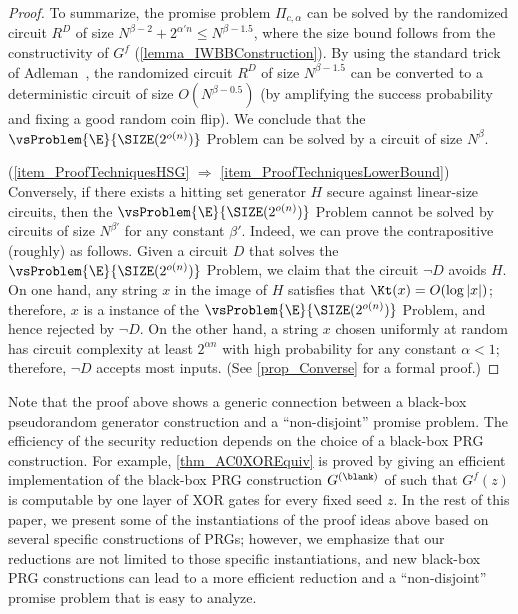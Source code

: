 \documentclass{toc}
\begin{document}
\begin{proof}
  To summarize,
  the promise problem $\Pi_{c, \alpha}$
  can be solved by the randomized circuit $R^D$
  of size $N^{\beta - 2} + 2^{\alpha' n} \le N^{\beta - 1.5}$, where the size bound follows from
  the constructivity of $G^f$ (\cref{lemma_IWBBConstruction}).
  By using the standard trick of Adleman~\cite{Adleman78_focs_conf},
  the randomized circuit $R^D$ of size $N^{\beta - 1.5}$ can be converted to a
  deterministic circuit of size $O(N^{\beta-0.5})$
  (by amplifying the success probability and fixing a good random coin flip).
  We conclude that
  the $\vsProblem{\E}{\SIZE(2^{o(n)})}$ Problem can be solved by a circuit of size $N^{\beta}$.

  (\cref{item_ProofTechniquesHSG} $\Rightarrow$ \ref{item_ProofTechniquesLowerBound})
  Conversely,
  if there exists a hitting set generator $H$ secure against linear-size circuits,
  then the $\vsProblem{\E}{\SIZE(2^{o(n)})}$ Problem cannot be solved by circuits of size $N^{\beta'}$
  for any constant $\beta'$.
  Indeed, we can prove the contrapositive (roughly) as follows.
  Given a circuit $D$ that solves the $\vsProblem{\E}{\SIZE(2^{o(n)})}$ Problem,
  we claim that the circuit $\neg D$ avoids $H$.
  On one hand,
  any string $x$ in the image of $H$ satisfies that $\Kt(x) = O(\log |x|)$;
  therefore, $x$ is a \Yes instance of
  the $\vsProblem{\E}{\SIZE(2^{o(n)})}$ Problem,
  and hence rejected by $\neg D$.
  On the other hand,
  a string $x$ chosen uniformly at random
  has circuit complexity at least $2^{\alpha n}$ with high probability
  for any constant $\alpha < 1$;
  therefore, $\neg D$ accepts most inputs.
  (See \cref{prop_Converse} for a formal proof.)
\end{proof}


Note that the proof above shows a generic connection
between
a black-box pseudorandom generator construction
and
a ``non-disjoint'' promise problem.
The efficiency of the security reduction depends on the choice of a
black-box PRG construction.
For example, \cref{thm_AC0XOREquiv} is proved by giving an efficient implementation
of the black-box PRG construction $G^{(\blank)}$ of \cite{ImpagliazzoW97_stoc_conf}
such that $G^f(z)$ is computable by one layer of XOR gates for every fixed seed $z$.
In the rest of this paper, we present some of the instantiations of
the proof ideas above
based on several specific constructions of PRGs;
however, we emphasize that our reductions are not limited to those specific instantiations,
and new black-box PRG constructions can lead to a more efficient reduction
and a ``non-disjoint'' promise problem that is easy to analyze.
\end{document}
